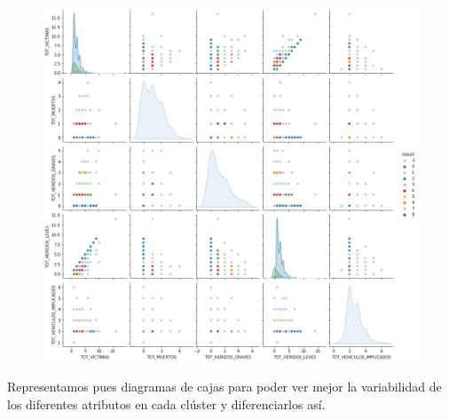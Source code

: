 \documentclass[a4]{article}
\begin{document}
\begin{figure}[H]
  \centering
  \includegraphics[width=153mm]{imagenes/c1_dbscan_pairplot}
\end{figure}

Representamos pues diagramas de cajas para poder ver mejor la variabilidad de los diferentes atributos en cada clúster y diferenciarlos así.
\end{document}
